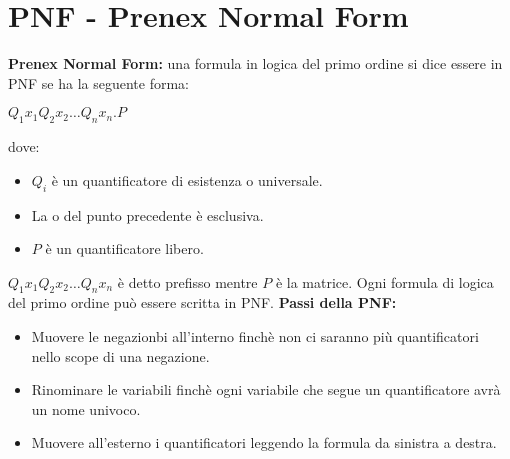 \documentclass[../main.tex]{subfiles}
\begin{document}
   \section{PNF - Prenex Normal Form}
   \textbf{Prenex Normal Form:} una formula in logica del primo ordine si dice essere in PNF se ha la seguente forma:
   \begin{center}
      $Q_1 x_1 Q_2 x_2 \dots Q_n x_n .P$
   \end{center}
   dove:
   \begin{itemize}
      \item $Q_i$ è un quantificatore di esistenza o universale.
      \item La o del punto precedente è esclusiva.
      \item $P$ è un quantificatore libero.
   \end{itemize}
   $Q_1 x_1 Q_2 x_2 \dots Q_n x_n$ è detto prefisso mentre $P$ è la matrice.
   \spazio
   Ogni formula di logica del primo ordine può essere scritta in PNF.
   \spazio
   \textbf{Passi della PNF:}
   \begin{itemize}
      \item Muovere le negazionbi all'interno finchè non ci saranno più quantificatori nello scope di una negazione.
      \item Rinominare le variabili finchè ogni variabile che segue un quantificatore avrà un nome univoco.
      \item Muovere all'esterno i quantificatori leggendo la formula da sinistra a destra.
   \end{itemize}
\end{document}
